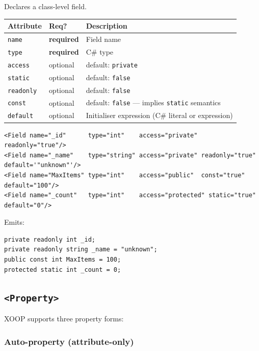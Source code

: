 \documentclass[11pt,a4paper]{article}
\newcommand{\el}[1]{\texttt{\textcolor{xoop-keyword}{<#1>}}}
\newcommand{\attr}[1]{\texttt{\textcolor{xoop-attr}{#1}}}
\newcommand{\required}{\textcolor{xoop-red}{\textbf{required}}}
\newcommand{\optional}{\textcolor{xoop-green}{optional}}
\newcommand{\default}[1]{\textcolor{xoop-green}{default: \texttt{#1}}}
\begin{document}
Declares a class-level field.

\begin{center}
\begin{tabularx}{\linewidth}{llX}
\toprule
Attribute & Req? & Description \\
\midrule
\attr{name}     & \required & Field name \\
\attr{type}     & \required & C\# type \\
\attr{access}   & \optional & \default{private} \\
\attr{static}   & \optional & \default{false} \\
\attr{readonly} & \optional & \default{false} \\
\attr{const}    & \optional & \default{false} — implies \texttt{static} semantics \\
\attr{default}  & \optional & Initialiser expression (C\# literal or expression) \\
\bottomrule
\end{tabularx}
\end{center}

\begin{lstlisting}[caption={Field examples}]
<Field name="_id"      type="int"    access="private" readonly="true"/>
<Field name="_name"    type="string" access="private" readonly="true" default='"unknown"'/>
<Field name="MaxItems" type="int"    access="public"  const="true" default="100"/>
<Field name="_count"   type="int"    access="protected" static="true" default="0"/>
\end{lstlisting}

Emits:
\begin{lstlisting}[style=csstyle, numbers=none]
private readonly int _id;
private readonly string _name = "unknown";
public const int MaxItems = 100;
protected static int _count = 0;
\end{lstlisting}

\subsection{\el{Property}}

XOOP supports three property forms:

\subsubsection{Auto-property (attribute-only)}
\end{document}
